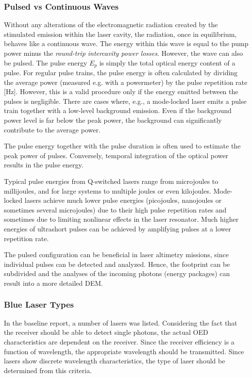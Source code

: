 	\subsubsection{Pulsed vs Continuous Waves}
Without any alterations of the electromagnetic radiation created by the stimulated emission within the \acs{laser} cavity, the radiation, once in equilibrium, behaves like a continuous wave. The energy within this wave is equal to the pump power minus the \textit{round-trip intercavity power losses}. However, the wave can also be pulsed. The pulse energy $E_{p}$ is simply the total optical energy content of a pulse. For regular pulse trains, the pulse energy is often calculated by dividing the average power (measured e.g. with a powermeter) by the pulse repetition rate [Hz]. However, this is a valid procedure only if the energy emitted between the pulses is negligible. There are cases where, e.g., a mode-locked laser emits a pulse train together with a low-level background emission. Even if the background power level is far below the peak power, the background can significantly contribute to the average power. 

The pulse energy together with the pulse duration is often used to estimate the peak power of pulses. Conversely, temporal integration of the optical power results in the pulse energy.

Typical pulse energies from Q-switched lasers range from microjoules to millijoules, and for large systems to multiple joules or even kilojoules. Mode-locked lasers achieve much lower pulse energies (picojoules, nanojoules or sometimes several microjoules) due to their high pulse repetition rates and sometimes due to limiting nonlinear effects in the laser resonator. Much higher energies of ultrashort pulses can be achieved by amplifying pulses at a lower repetition rate.

The pulsed configuration can be beneficial in \acs{laser} altimetry missions, since individual pulses can be detected and analyzed. Hence, the footprint can be subdivided and the analyses of the incoming photons (energy packages) can result into a more detailed \acs{DEM}.  

	\subsubsection{Blue Laser Types}
In the baseline report, a number of \acs{laser}s was listed. Considering the fact that the receiver should be able to detect single photons, the actual \acs{OED} characteristics are dependent on the receiver. Since the receiver efficiency is a function of wavelength, the appropriate wavelength should be transmitted. Since \acs{laser}s show discrete wavelength characteristics, the type of \acs{laser} should be determined from this criteria.

